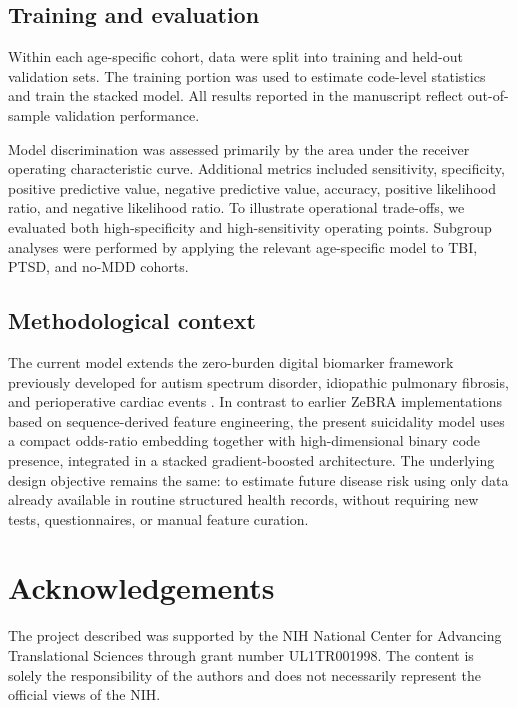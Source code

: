 \documentclass[onecolumn, compsoc,11pt]{IEEEtran}
\begin{document}
\subsection*{Training and evaluation}

Within each age-specific cohort, data were split into training and held-out validation sets. The training portion was used to estimate code-level statistics and train the stacked model. All results reported in the manuscript reflect out-of-sample validation performance.

Model discrimination was assessed primarily by the area under the receiver operating characteristic curve. Additional metrics included sensitivity, specificity, positive predictive value, negative predictive value, accuracy, positive likelihood ratio, and negative likelihood ratio. To illustrate operational trade-offs, we evaluated both high-specificity and high-sensitivity operating points. Subgroup analyses were performed by applying the relevant age-specific model to TBI, PTSD, and no-MDD cohorts.


\subsection*{Methodological context}

The current model extends the zero-burden digital biomarker framework previously developed for autism spectrum disorder, idiopathic pulmonary fibrosis, and perioperative cardiac events \cite{onishchenko2021reduced,onishchenko2022screening,JAHA2022}. In contrast to earlier ZeBRA implementations based on sequence-derived feature engineering, the present suicidality model uses a compact odds-ratio embedding together with high-dimensional binary code presence, integrated in a stacked gradient-boosted architecture. The underlying design objective remains the same: to estimate future disease risk using only data already available in routine structured health records, without requiring new tests, questionnaires, or manual feature curation.














\section*{Acknowledgements}
The project described was supported by the NIH National Center for Advancing Translational Sciences through grant number UL1TR001998.  The content is solely the responsibility of the authors and does not necessarily represent the official views of the NIH.
\end{document}
